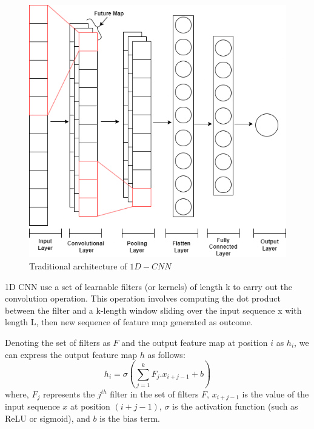 \documentclass[a4paper,fleqn]{cas-sc}
\begin{document}
\begin{figure}[h!]
  \centering
    \includegraphics[scale=.5]{img/cnn}
    \caption{Traditional architecture of $1D-CNN$}\label{CNN}
\end{figure}

1D CNN use a set of learnable filters (or kernels) of length k to carry out the convolution operation. This operation involves computing the dot product between the filter and a k-length window sliding over the input sequence x with length L, then new sequence of feature map generated as outcome.

Denoting the set of filters as $F$ and the output feature map at position $i$ as $h_i$, we can express the output feature map $h$ as follows:
\begin{equation}\label{equ:cnn}
        h_i = \sigma \left (\sum_{j=1}^{k}F_{j}.x_{i+j-1}+b \right)
\end{equation}
where, $F_j$ represents the $j^{th}$ filter in the set of filters $F$, $x_{i+j-1}$ is the value of the input sequence $x$ at position $(i+j-1)$, $\sigma$ is the activation function (such as ReLU or sigmoid), and $b$ is the bias term.
\end{document}
